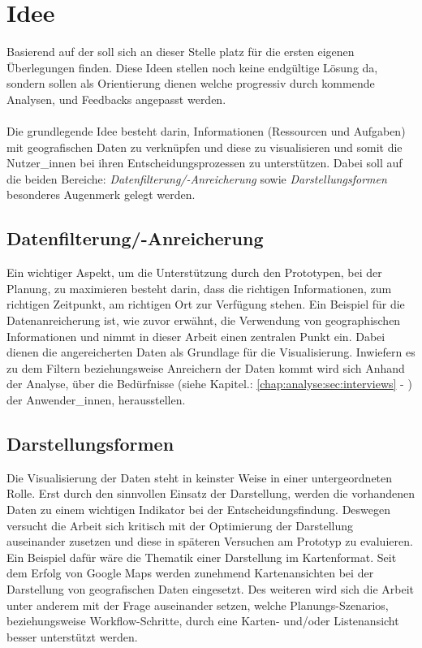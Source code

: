 \documentclass[Bachelorarbeit.tex]{subfiles}
\begin{document}
\section{Idee}
\label{chap:einfuehrung:sec:idee}

Basierend auf der  soll sich an dieser Stelle platz für die ersten eigenen Überlegungen finden. 
Diese Ideen stellen noch keine endgültige Lösung da, sondern sollen als Orientierung dienen welche progressiv durch kommende Analysen,  und Feedbacks angepasst werden.\\
\\
Die grundlegende Idee besteht darin, Informationen (Ressourcen und Aufgaben) mit geografischen Daten zu verknüpfen und diese zu visualisieren und somit die Nutzer\_innen bei ihren Entscheidungsprozessen zu unterstützen. 
Dabei soll auf die beiden Bereiche: \textit{Datenfilterung/-Anreicherung} sowie \textit{Darstellungsformen} besonderes Augenmerk gelegt werden.

\subsection*{Datenfilterung/-Anreicherung}
Ein wichtiger Aspekt, um die Unterstützung durch den Prototypen, bei der Planung, zu maximieren besteht darin, dass die richtigen Informationen, zum richtigen Zeitpunkt, am richtigen Ort zur Verfügung stehen. 
Ein Beispiel für die Datenanreicherung ist, wie zuvor erwähnt, die Verwendung von geographischen Informationen und nimmt in dieser Arbeit einen zentralen Punkt ein. 
Dabei dienen die angereicherten Daten als Grundlage für die Visualisierung.
Inwiefern es zu dem Filtern beziehungsweise Anreichern der Daten kommt wird sich Anhand der Analyse, über die Bedürfnisse (siehe Kapitel.: \ref{chap:analyse:sec:interviews} - ) der Anwender\_innen, herausstellen.

\subsection*{Darstellungsformen}
Die Visualisierung der Daten steht in keinster Weise in einer untergeordneten Rolle.
Erst durch den sinnvollen Einsatz der Darstellung, werden die vorhandenen Daten zu einem wichtigen Indikator bei der Entscheidungsfindung.
Deswegen versucht die Arbeit sich kritisch mit der Optimierung der Darstellung auseinander zusetzen und diese in späteren Versuchen am Prototyp zu evaluieren.
Ein Beispiel dafür wäre die Thematik einer Darstellung im Kartenformat.
Seit dem Erfolg von Google Maps werden zunehmend Kartenansichten bei der Darstellung von geografischen Daten eingesetzt. 
Des weiteren wird sich die Arbeit unter anderem mit der Frage auseinander setzen, welche Planungs-Szenarios, beziehungsweise Workflow-Schritte, durch eine Karten- und/oder Listenansicht besser unterstützt werden.
\end{document}
